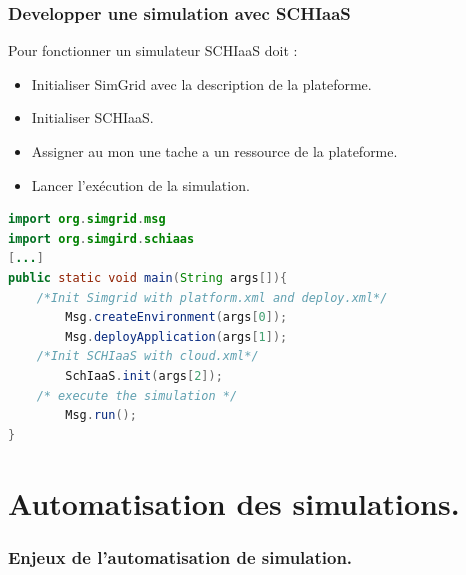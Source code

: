 \documentclass{beamer}
\begin{document}

\begin{frame}[fragile]
	\frametitle{Developper une simulation avec SCHIaaS}
	Pour fonctionner un simulateur SCHIaaS doit :
	\begin{itemize}
		\item Initialiser SimGrid avec la description de la plateforme.
		\item Initialiser SCHIaaS.
		\item Assigner au mon une tache a un ressource de la plateforme.
		\item Lancer l'exécution de la simulation.
	\end{itemize}
	\begin{lstlisting}[basicstyle=\footnotesize,language=Java,
	backgroundcolor=\color{gray!10},
	commentstyle=\color{red!90}
	]
import org.simgrid.msg
import org.simgird.schiaas
[...]
public static void main(String args[]){
    /*Init Simgrid with platform.xml and deploy.xml*/
        Msg.createEnvironment(args[0]);
        Msg.deployApplication(args[1]);
    /*Init SCHIaaS with cloud.xml*/
        SchIaaS.init(args[2]);
    /* execute the simulation */
        Msg.run();
}
	\end{lstlisting}
\end{frame}

\section{Automatisation des simulations.}

\begin{frame}
	\frametitle{Enjeux de l'automatisation de simulation.}
\end{frame}
\end{document}
